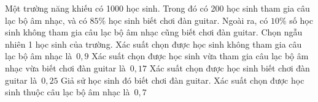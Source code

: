 \begin{ex}%
	Một trường năng khiếu có 1000 học  sinh. Trong đó có 200 học sinh tham gia câu lạc bộ âm nhạc, và có $ 85\% $ học sinh biết chơi đàn guitar. Ngoài ra, có $ 10\% $ số học sinh không tham gia câu lạc bộ âm nhạc cũng biết chơi đàn guitar. Chọn ngẫu nhiên 1 học sinh của trường.
	\choiceTF 
		{Xác suất chọn được học sinh không  tham gia câu lạc bộ âm nhạc là~$ 0{,}9 $}
		{\True Xác suất chọn được học sinh vừa tham gia câu lạc bộ âm nhạc vừa biết chơi đàn guitar là~$ 0{,}17 $} 
		{\True Xác suất chọn được học sinh biết chơi đàn guitar là~$ 0{,}25 $} 
		{Giả sử học sinh đó biết chơi đàn guitar. Xác  suất chọn được học sinh thuộc câu lạc bộ âm nhạc là~$ 0{,}7 $}
\end{ex}

